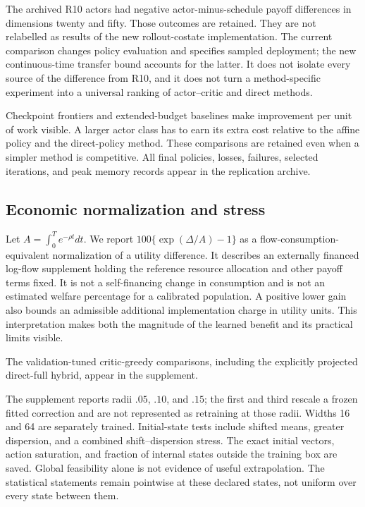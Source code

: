 The archived R10 actors had negative actor-minus-schedule payoff differences in dimensions twenty and fifty. Those outcomes are retained. They are not relabelled as results of the new rollout-costate implementation. The current comparison changes policy evaluation and specifies sampled deployment; the new continuous-time transfer bound accounts for the latter. It does not isolate every source of the difference from R10, and it does not turn a method-specific experiment into a universal ranking of actor--critic and direct methods.


Checkpoint frontiers and extended-budget baselines make improvement per unit of work visible. A larger actor class has to earn its extra cost relative to the affine policy and the direct-policy method. These comparisons are retained even when a simpler method is competitive. All final policies, losses, failures, selected iterations, and peak memory records appear in the replication archive.

\subsection{Economic normalization and stress}
Let $A=\int_0^T e^{-\rho t}dt$. We report $100\{\exp(\Delta/A)-1\}$ as a flow-consumption-equivalent normalization of a utility difference. It describes an externally financed log-flow supplement holding the reference resource allocation and other payoff terms fixed. It is not a self-financing change in consumption and is not an estimated welfare percentage for a calibrated population. A positive lower gain also bounds an admissible additional implementation charge in utility units. This interpretation makes both the magnitude of the learned benefit and its practical limits visible.


The validation-tuned critic-greedy comparisons, including the explicitly projected direct-full hybrid, appear in the supplement.

The supplement reports radii $.05$, $.10$, and $.15$; the first and third rescale a frozen fitted correction and are not represented as retraining at those radii. Widths 16 and 64 are separately trained. Initial-state tests include shifted means, greater dispersion, and a combined shift--dispersion stress. The exact initial vectors, action saturation, and fraction of internal states outside the training box are saved. Global feasibility alone is not evidence of useful extrapolation. The statistical statements remain pointwise at these declared states, not uniform over every state between them.


